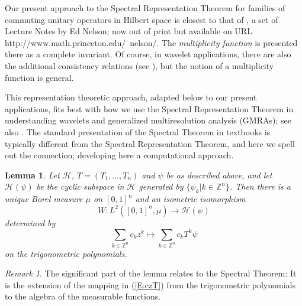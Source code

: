 \documentclass{birkmult}
\newtheorem{lem}[thm]{Lemma}
\theoremstyle{definition}
\theoremstyle{remark}
\newtheorem{rem}[thm]{Remark}
\numberwithin{equation}{section}
\begin{document}
Our present approach to the Spectral Representation Theorem for families 
of commuting unitary operators in Hilbert space is closest to that of 
\cite{Nel69}, a set of Lecture Notes by Ed Nelson; now out of print but 
available on URL http://www.math.princeton.edu/~nelson/. The 
\textit{multiplicity function} is presented there as a complete invariant. 
Of course, in wavelet applications, there are also the additional consistency 
relations (see \cite{BMM99}), but the notion of a multiplicity function is 
general.
 
This representation theoretic approach, adapted below to our present 
applications,  fits best with how we use the Spectral Representation 
Theorem in understanding wavelets and generalized multiresolution 
analysis (GMRAs); see also \cite{Bag00, BJMP05, BMM99}.  The standard 
presentation of the Spectral Theorem in textbooks is typically different 
from the Spectral Representation Theorem, and here we spell out the 
connection; developing here a computational approach. 

\begin{lem}
\label{L:3.1}
Let $\mathcal{H}$, $T=(T_{1}, ..., T_{n})$ and $\psi$ be as described above,
and let $\mathcal{H}(\psi)$ be the cyclic subspace in $\mathcal{H}$ 
generated by $\{\psi_{k}|k \in \mathbb{Z}^{n}\}$.  Then there is a unique 
Borel measure $\mu$ on $[0,1]^{n}$ and an isometric isomorphism
\begin{equation}
\label{E:isom}
  W:L^{2}([0,1]^{n}, \mu) \to \mathcal{H}(\psi)
\end{equation}
determined by 
\begin{equation}
\label{E:czT}
  \sum_{k \in \mathbb{Z}^{n}}c_{k}z^{k} \mapsto 
  \sum_{k \in \mathbb{Z}^{n}}c_{k}T^{k}\psi
\end{equation}
on the trigonometric polynomials.
\end{lem}

\begin{rem}
The significant part of the lemma relates to the Spectral Theorem: It is the
extension of the mapping in (\ref{E:czT}) from the trigonometric polynomials 
to the algebra of the measurable functions. 
\end{rem}
\end{document}
